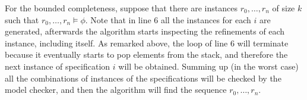 	For the bounded completeness, suppose that there are instances $r_0, \dots, r_n$ of size $k$ such that $r_0, \dots, r_n \vDash \phi$. Note that in line $6$ all the instances for each $i$ are generated, afterwards the algorithm starts inspecting the refinements of each instance, including itself. As remarked above, the loop of line $6$ will terminate because it eventually starts to pop elements from the stack, and therefore the next instance of specification $i$ will be obtained. Summing up (in the worst case) all the combinations of instances of the specifications will be checked by the model checker, and then the algorithm will find the sequence $r_0,\dots,r_n$.  

